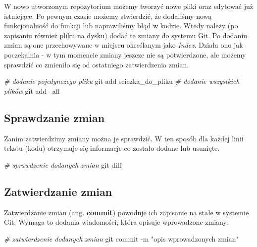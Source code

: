 \documentclass[paper=6in:9in,pagesize=pdftex,headinclude=on,footinclude=on,10pt]{scrbook}
\newenvironment{Shaded}{\begin{snugshade}}{\end{snugshade}}
\newcommand{\CommentTok}[1]{\textcolor[rgb]{0.56,0.35,0.01}{\textit{#1}}}
\newcommand{\FunctionTok}[1]{\textcolor[rgb]{0.00,0.00,0.00}{#1}}
\newcommand{\NormalTok}[1]{#1}
\newcommand{\StringTok}[1]{\textcolor[rgb]{0.31,0.60,0.02}{#1}}
\begin{document}
W nowo utworzonym repozytorium możemy tworzyć nowe pliki oraz edytować już istniejące.
Po pewnym czasie możemy stwierdzić, że dodaliśmy nową funkcjonalność do funkcji lub naprawiliśmy błąd w kodzie.
Wtedy należy (po zapisaniu również pliku na dysku) dodać te zmiany do systemu Git.
Po dodaniu zmian są one przechowywane w miejscu określanym jako \emph{Index}.
Działa ono jak poczekalnia - w tym momencie zmiany jeszcze nie są potwierdzone, ale możemy sprawdzić co zmieniło się od ostatniego zatwierdzenia zmian.

\begin{Shaded}
\begin{Highlighting}[]
\CommentTok{# dodanie pojedynczego pliku}
\FunctionTok{git}\NormalTok{ add sciezka_do_pliku  }
\CommentTok{# dodanie wszystkich plików }
\FunctionTok{git}\NormalTok{ add --all                    }
\end{Highlighting}
\end{Shaded}

\hypertarget{sprawdzanie-zmian}{%
\subsection{Sprawdzanie zmian}\label{sprawdzanie-zmian}}

Zanim zatwierdzimy zmiany można je sprawdzić.
W ten sposób dla każdej linii tekstu (kodu) otrzymuje się informacje co zostało dodane lub usunięte.

\begin{Shaded}
\begin{Highlighting}[]
\CommentTok{# sprawdzenie dodanych zmian}
\FunctionTok{git}\NormalTok{ diff                  }
\end{Highlighting}
\end{Shaded}

\hypertarget{zatwierdzanie-zmian}{%
\subsection{Zatwierdzanie zmian}\label{zatwierdzanie-zmian}}

Zatwierdzanie zmian (ang. \textbf{commit}) powoduje ich zapisanie na stałe w systemie Git.
Wymaga to dodania wiadomości, która opisuje wprowadzone zmiany.

\begin{Shaded}
\begin{Highlighting}[]
\CommentTok{# zatwierdzenie dodanych zmian}
\FunctionTok{git}\NormalTok{ commit -m }\StringTok{"opis wprowadzonych zmian"}
\end{Highlighting}
\end{Shaded}
\end{document}
